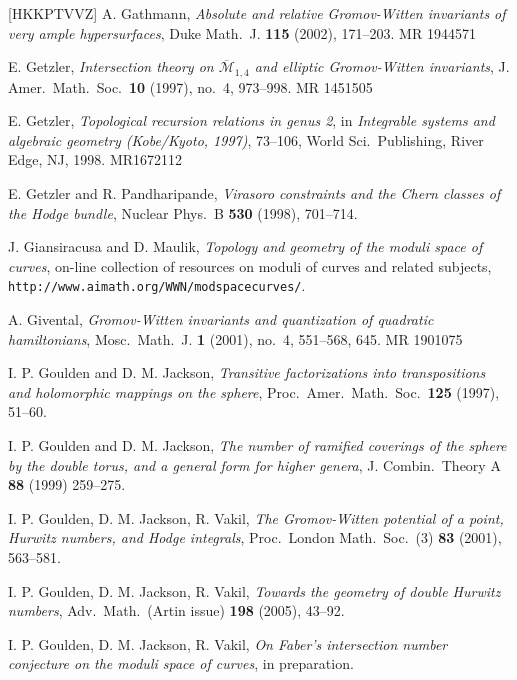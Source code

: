 \documentclass[12pt,letterpaper]{amsart}
\newcommand{\cm}{{\mathcal{M}}}
\newcommand{\cmbar}{\overline{\cm}}
\newcommand{\cited}{}
\newcommand{\lremind}[1]{{\bf[label:  #1]}}
\renewcommand{\lremind}[1]{{}}
\begin{document}
\begin{thebibliography}{[HKKPTVVZ]}
 A. Gathmann, {\em Absolute and relative
    Gromov-Witten invariants of very ample hypersurfaces}, Duke Math.\
  J. {\bf 115} (2002), 171--203.  MR 1944571 \cited

  E. Getzler, {\em Intersection theory on
$\cmbar_{1,4}$ and elliptic Gromov-Witten invariants}, J. Amer.\ Math.\
Soc.\ {\bf 10} (1997), no.\ 4, 973--998.  MR 1451505 \cited

 E. Getzler, {\em Topological recursion relations in 
genus 2}, in {\em Integrable systems and algebraic geometry (Kobe/Kyoto, 1997)},
73--106, World Sci.\ Publishing, River Edge, NJ, 1998.    MR1672112
\cited

 E. Getzler and R. Pandharipande,
{\em Virasoro constraints and the Chern classes of the Hodge bundle},
Nuclear Phys.\ B {\bf 530} (1998), 701--714.  
\cited

 J. Giansiracusa and D. Maulik, {\em Topology and
    geometry of the moduli space of curves}, on-line collection of
  resources on moduli of curves and related subjects,
  \verb+http://www.aimath.org/WWN/modspacecurves/+.

 A. Givental, {\em Gromov-Witten invariants and 
quantization of quadratic hamiltonians}, Mosc.\ Math.\ J. {\bf 1} (2001), no.\ 4,
551--568, 645.  MR 1901075
\lremind{math.AG/0108100}

 I. P. Goulden and D. M. Jackson, 
{\em Transitive factorizations into transpositions and holomorphic
mappings on the sphere},
Proc.\  Amer.\  Math.\  Soc.\
{\bf 125} (1997), 51--60.
\cited

I. P. Goulden and D. M. Jackson, {\em The
number of ramified coverings of the sphere by the double
torus, and a general form for higher genera}, J. Combin.\ Theory
A {\bf 88} (1999) 259--275. \cited

\bibitem[GJV1]{gjv1} I. P. Goulden, D. M. Jackson, R. Vakil,
{\em The Gromov-Witten potential of a point, Hurwitz numbers, and Hodge
integrals}, Proc.\ London Math.\ Soc.\ (3) {\bf 83} (2001), 563--581. \cited

\bibitem[GJV2]{double} I. P. Goulden, D. M. Jackson, R. Vakil,
{\em Towards the geometry of double Hurwitz numbers}, 
Adv.\ Math.\ (Artin issue) {\bf 198} (2005), 43--92. \cited

\bibitem[GJV3]{gjv} I. P. Goulden, D. M. Jackson, R. Vakil,
{\em On Faber's intersection number conjecture on the moduli space
of curves}, in preparation. \cited


\end{thebibliography}
\end{document}
